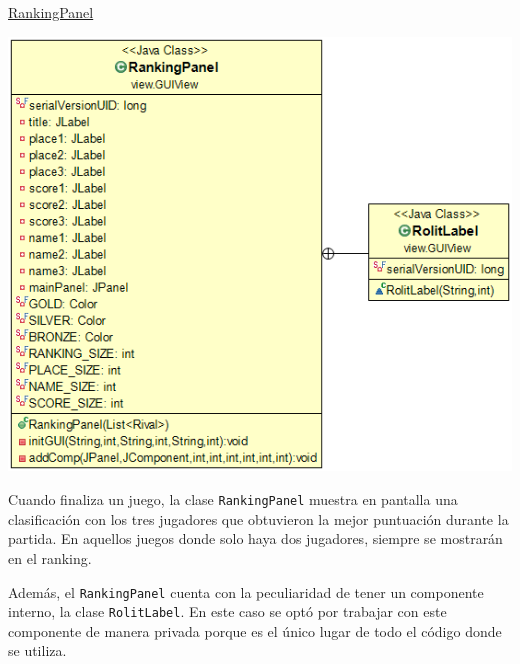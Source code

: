 \documentclass[12pt,a4paper,openright]{book}
\theoremstyle{break}
\begin{document}
\newpage

\underline{RankingPanel}

\begin{center}
\includegraphics[scale=0.55]{rankingpanel.png}
\end{center}

Cuando finaliza un juego, la clase \texttt{RankingPanel} muestra en pantalla una clasificación con los tres jugadores que obtuvieron la mejor puntuación durante la partida. En aquellos juegos donde solo haya dos jugadores, siempre se mostrarán en el ranking.

Además, el \texttt{RankingPanel} cuenta con la peculiaridad de tener un componente interno, la clase \texttt{RolitLabel}. En este caso se optó por trabajar con este componente de manera privada porque es el único lugar de todo el código donde se utiliza.
\end{document}
